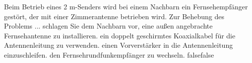     {Beim Betrieb eines 2 m-Senders wird bei einem Nachbarn ein Fernsehempfänger gestört, der mit einer Zimmerantenne betrieben wird. Zur Behebung des Problems ...}
    {schlagen Sie dem Nachbarn vor, eine außen angebrachte Fernsehantenne zu installieren.}
    {ein doppelt geschirmtes Koaxialkabel für die Antennenleitung zu verwenden.}
    {einen Vorverstärker in die Antennenleitung einzuschleifen.}
    {den Fernsehrundfunkempfänger zu wechseln.}
    {false}{false}